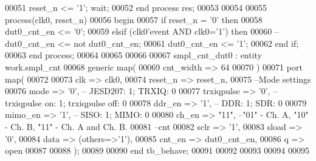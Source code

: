 \begin{DoxyCode}
00051         \textcolor{vhdlchar}{reset_n} \textcolor{vhdlchar}{<=} \textcolor{vhdlchar}{'}\textcolor{vhdllogic}{}\textcolor{vhdllogic}{1}\textcolor{vhdlchar}{'}; \textcolor{keywordflow}{wait};
00052     \textcolor{keywordflow}{end} \textcolor{keywordflow}{process} \textcolor{vhdlchar}{res};
00053    
00054    
00055  \textcolor{keywordflow}{process}(clk0, reset_n)
00056 \textcolor{vhdlkeyword}{   begin}
00057       \textcolor{keywordflow}{if} \textcolor{vhdlchar}{reset_n} \textcolor{vhdlchar}{=} \textcolor{vhdlchar}{'}\textcolor{vhdllogic}{}\textcolor{vhdllogic}{0}\textcolor{vhdlchar}{'} \textcolor{keywordflow}{then} 
00058          \textcolor{vhdlchar}{dut0_cnt_en} \textcolor{vhdlchar}{<=} \textcolor{vhdlchar}{'}\textcolor{vhdllogic}{}\textcolor{vhdllogic}{0}\textcolor{vhdlchar}{'};
00059       \textcolor{keywordflow}{elsif} \textcolor{vhdlchar}{(}\textcolor{vhdlchar}{clk0}\textcolor{vhdlchar}{'}\textcolor{vhdlkeyword}{event} \textcolor{keywordflow}{AND} \textcolor{vhdlchar}{clk0}\textcolor{vhdlchar}{=}\textcolor{vhdlchar}{'}\textcolor{vhdllogic}{}\textcolor{vhdllogic}{1}\textcolor{vhdlchar}{'}\textcolor{vhdlchar}{)} \textcolor{keywordflow}{then} 
00060 \textcolor{keyword}{         --dut0\_cnt\_en <= not dut0\_cnt\_en;}
00061          \textcolor{vhdlchar}{dut0_cnt_en} \textcolor{vhdlchar}{<=} \textcolor{vhdlchar}{'}\textcolor{vhdllogic}{}\textcolor{vhdllogic}{1}\textcolor{vhdlchar}{'};
00062       \textcolor{keywordflow}{end} \textcolor{keywordflow}{if};
00063    \textcolor{keywordflow}{end} \textcolor{keywordflow}{process};
00064    
00065     
00066   
00067 smpl\_cnt\_dut0 : \textcolor{keywordflow}{entity} work.smpl_cnt 
00068    \textcolor{keywordflow}{generic} \textcolor{keywordflow}{map}(
00069       cnt_width   =>  \textcolor{vhdllogic}{64}
00070    \textcolor{vhdlchar}{)}
00071    \textcolor{keywordflow}{port} \textcolor{keywordflow}{map}(
00072 
00073       clk         => clk0,
00074       reset_n     => reset_n,
00075 \textcolor{keyword}{      --Mode settings}
00076       mode          => '0',\textcolor{keyword}{ -- JESD207: 1; TRXIQ: 0}
00077         trxiqpulse  => '0',\textcolor{keyword}{ -- trxiqpulse on: 1; trxiqpulse off: 0}
00078         ddr_en      => '1',\textcolor{keyword}{ -- DDR: 1; SDR: 0}
00079         mimo_en     => '1',\textcolor{keyword}{ -- SISO: 1; MIMO: 0}
00080         ch_en           => "\textcolor{vhdllogic}{11}",\textcolor{keyword}{ --"01" - Ch. A, "10" - Ch. B, "11" - Ch. A and Ch. B.}
00081 \textcolor{keyword}{      --cnt}
00082       sclr        => '1',
00083       sload       => '0',
00084       data        => \textcolor{vhdlchar}{(}\textcolor{keywordflow}{others}=>'1'\textcolor{vhdlchar}{)},
00085       cnt_en      => dut0_cnt_en,
00086       q           => \textcolor{keywordflow}{open}
00087           
00088         \textcolor{vhdlchar}{)};
00089     
00090     \textcolor{keywordflow}{end} \textcolor{vhdlchar}{tb\_behave};
00091   
00092   
00093 
00094 
00095   
\end{DoxyCode}
